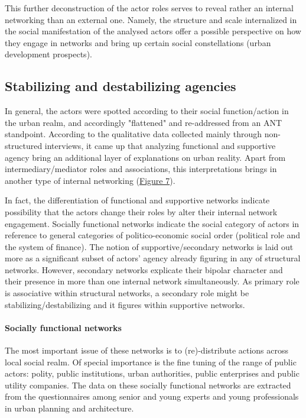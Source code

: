 \documentclass[11pt]{report}
\begin{document}
This further deconstruction of the actor roles serves to reveal rather an internal networking than an external one. Namely, the structure and scale internalized in the social manifestation of the analysed actors offer a possible perspective on how they engage in networks and bring up certain social constellations (urban development prospects).

\subsection{Stabilizing and destabilizing agencies}

In general, the actors were spotted according to their social function/action in the urban realm, and accordingly "flattened" and re-addressed from an ANT standpoint.
According to the qualitative data collected mainly through non-structured interviews, it came up that analyzing functional and supportive agency bring an additional layer of explanations on urban reality.
Apart from intermediary/mediator roles and associations, this interpretations brings in another type of internal networking (\href{ref}{Figure 7}).

In fact, the differentiation of functional and supportive networks indicate possibility that the actors change their roles by alter their internal network engagement.
Socially functional networks indicate the social category of actors in reference to general categories of politico-economic social order (political role and the system of finance).
The notion of supportive/secondary networks is laid out more as a significant subset of actors' agency already figuring in any of structural networks.
However, secondary networks explicate their bipolar character and their presence in more than one internal network simultaneously.
As primary role is associative within structural networks, a secondary role might be stabilizing/destabilizing and it figures within supportive networks. 

\paragraph{Socially functional networks}

The most important issue of these networks is to (re)-distribute actions across local social realm.
Of special importance is the fine tuning of the range of public actors: polity, public institutions, urban authorities, public enterprises and public utility companies.
The data on these socially functional networks are extracted from the questionnaires among senior and young experts and young professionals in urban planning and architecture. 
\end{document}
